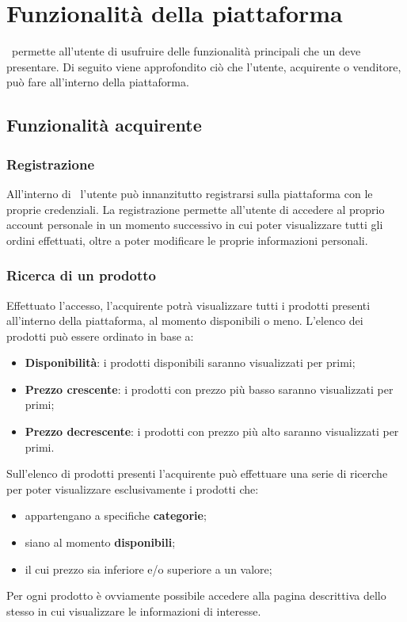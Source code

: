 \section{Funzionalità della piattaforma}
\NomeProgetto\ permette all'utente di usufruire delle funzionalità principali che un  deve presentare. Di seguito viene approfondito ciò che l'utente, acquirente o venditore, può fare all'interno della piattaforma.
\subsection{Funzionalità acquirente}
\subsubsection*{Registrazione}
All'interno di \NomeProgetto\ l'utente può innanzitutto registrarsi sulla piattaforma con le proprie credenziali. La registrazione permette all'utente di accedere al proprio account personale in un momento successivo in cui poter visualizzare tutti gli ordini effettuati, oltre a poter modificare le proprie informazioni personali. 
\subsubsection*{Ricerca di un prodotto}
Effettuato l'accesso, l'acquirente potrà visualizzare tutti i prodotti presenti all'interno della piattaforma, al momento disponibili o meno. L'elenco dei prodotti può essere ordinato in base a:
\begin{itemize}
	\item \textbf{Disponibilità}: i prodotti disponibili saranno visualizzati per primi;
	\item \textbf{Prezzo crescente}: i prodotti con prezzo più basso saranno visualizzati per primi;
	\item \textbf{Prezzo decrescente}: i prodotti con prezzo più alto saranno visualizzati per primi.
\end{itemize}
Sull'elenco di prodotti presenti l'acquirente può effettuare una serie di ricerche per poter visualizzare esclusivamente i prodotti che:
\begin{itemize}
	\item appartengano a specifiche \textbf{categorie};
	\item siano al momento \textbf{disponibili};
	\item il cui prezzo sia inferiore e/o superiore a un valore;
\end{itemize}
Per ogni prodotto è ovviamente possibile accedere alla pagina descrittiva dello stesso in cui visualizzare le informazioni di interesse.

